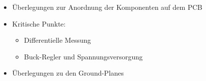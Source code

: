 \begin{itemize}
    \item
        \"Uberlegungen zur Anordnung der Komponenten auf dem PCB
    \item
        Kritische Punkte:
        \begin{itemize}
            \item
                Differentielle Messung
            \item
                Buck-Regler und Spannungsversorgung
        \end{itemize}
    \item
        \"Uberlegungen zu den Ground-Planes
\end{itemize}
